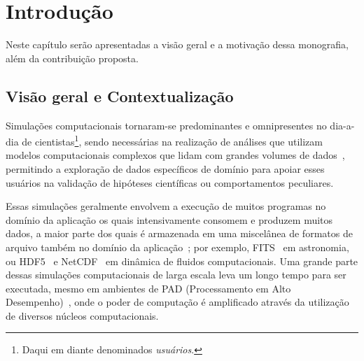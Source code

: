 
\chapter{Introdução}

Neste capítulo serão apresentadas a visão geral e a motivação dessa monografia, além da contribuição proposta.

\section{Visão geral e Contextualização}

Simulações computacionais tornaram-se predominantes e omnipresentes no dia-a-dia de cientistas\footnote{Daqui em diante denominados \textit{usuários}.}, sendo necessárias na realização de análises que utilizam modelos computacionais complexos que lidam com grandes volumes de dados~\cite{silva2015analyzing}, permitindo a exploração de dados específicos de domínio para apoiar esses usuários na validação de hipóteses científicas ou comportamentos peculiares.

Essas simulações geralmente envolvem a execução de muitos programas no domínio da aplicação os quais intensivamente consomem e produzem muitos dados, a maior parte dos quais é armazenada em uma miscelânea de formatos de arquivo também no domínio da aplicação~\cite{silva2015analyzing}; por exemplo,  FITS~\cite{greisen2002representations} em astronomia, ou  HDF5~\cite{hdfgroup2014hdf5} e  NetCDF~\cite{rew1990netcdf} em dinâmica de fluidos computacionais.
Uma grande parte dessas simulações computacionais de larga escala leva um longo tempo para ser executada, mesmo em ambientes de  PAD (Processamento em Alto Desempenho)~\cite{silva2017raw}, onde o poder de computação é amplificado através da utilização de diversos núcleos computacionais.

